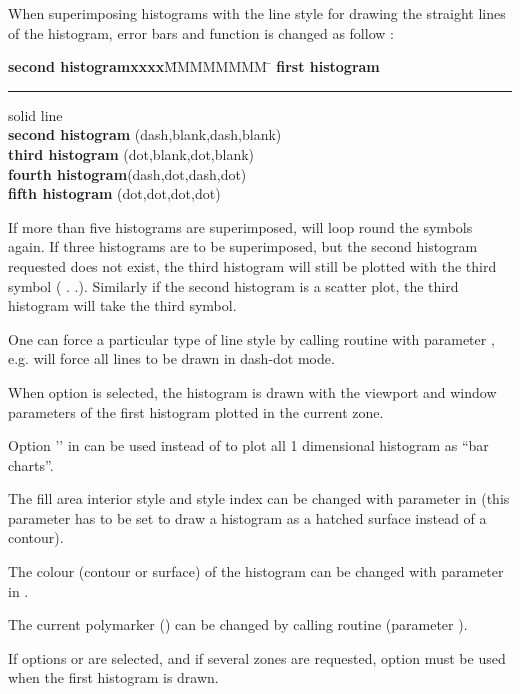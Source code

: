\begin{UL}
\item When superimposing histograms with  the line style for 
      drawing the straight lines of the histogram, error bars and function is 
      changed as follow :
      \begin{tabbing}
      {\bf second histogramxxxx}\= MMMMMMMM \= \kill
      {\bf first  histogram}\> \rule{1cm}{.5pt}\> solid line\\
      {\bf second histogram}\>{\tt\_ \_ \_} \>(dash,blank,dash,blank)\\
      {\bf third histogram} \>(dot,blank,dot,blank)\\
      {\bf fourth  histogram}\>(dash,dot,dash,dot)\\
      {\bf fifth  histogram} \>(dot,dot,dot,dot)
      \end{tabbing}
      If more than five histograms are superimposed, \HPLOT{} will loop round 
      the symbols again.  If three histograms are to be superimposed, but the 
      second histogram requested does not exist, the third histogram will still
      be plotted with the third symbol ( . .). Similarly if the second histogram
      is a scatter plot, the third histogram will take the third symbol.
\item One can force a particular type of line style by calling routine 
       with parameter , e.g. 
       will force all lines to be drawn in 
      dash-dot mode.
\item When option  is selected, the histogram is drawn with the 
      viewport and window parameters of the first histogram plotted in the 
      current zone.
\item Option '' in  can be used instead of 
       to plot all 1 dimensional histogram as ``bar charts''.
\item The fill area interior style and style index can be changed with parameter
       in  (this parameter has to be set to draw a 
      histogram as a hatched surface instead of a contour).
\item The colour (contour or surface) of the histogram can be changed with 
      parameter  in .
\item The current polymarker () can be changed by calling 
      \HIGZ{} routine  (parameter ).
\item If options  or  are selected, and if several zones are 
      requested, option  must be used when the first histogram is 
      drawn.
\end{UL}


